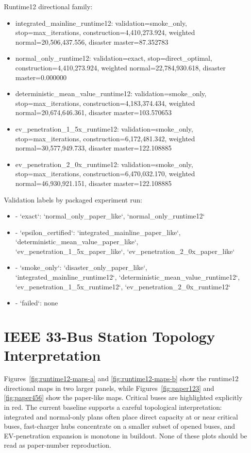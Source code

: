 \documentclass[11pt]{article}
\begin{document}
Runtime12 directional family:
\begin{itemize}
\item integrated\_mainline\_runtime12: validation=smoke\_only, stop=max\_iterations, construction=4,410,273.924, weighted normal=20,506,437.556, disaster master=87.352783
\item normal\_only\_runtime12: validation=exact, stop=direct\_optimal, construction=4,410,273.924, weighted normal=22,784,930.618, disaster master=0.000000
\item deterministic\_mean\_value\_runtime12: validation=smoke\_only, stop=max\_iterations, construction=4,183,374.434, weighted normal=20,674,646.361, disaster master=103.570653
\item ev\_penetration\_1\_5x\_runtime12: validation=smoke\_only, stop=max\_iterations, construction=6,172,481.342, weighted normal=30,577,949.733, disaster master=122.108885
\item ev\_penetration\_2\_0x\_runtime12: validation=smoke\_only, stop=max\_iterations, construction=6,470,032.170, weighted normal=46,930,921.151, disaster master=122.108885
\end{itemize}

Validation labels by packaged experiment run:
\begin{itemize}
\item - `exact`: `normal\_only\_paper\_like`, `normal\_only\_runtime12`
\item - `epsilon\_certified`: `integrated\_mainline\_paper\_like`, `deterministic\_mean\_value\_paper\_like`, `ev\_penetration\_1\_5x\_paper\_like`, `ev\_penetration\_2\_0x\_paper\_like`
\item - `smoke\_only`: `disaster\_only\_paper\_like`, `integrated\_mainline\_runtime12`, `deterministic\_mean\_value\_runtime12`, `ev\_penetration\_1\_5x\_runtime12`, `ev\_penetration\_2\_0x\_runtime12`
\item - `failed`: none
\end{itemize}

\section{IEEE 33-Bus Station Topology Interpretation}
Figures~\ref{fig:runtime12-maps-a} and \ref{fig:runtime12-maps-b} show the runtime12 directional maps in two larger panels, while Figures~\ref{fig:paper123} and \ref{fig:paper456} show the paper-like maps. Critical buses are highlighted explicitly in red. The current baseline supports a careful topological interpretation: integrated and normal-only plans often place direct capacity at or near critical buses, fast-charger hubs concentrate on a smaller subset of opened buses, and EV-penetration expansion is monotone in buildout. None of these plots should be read as paper-number reproduction.
\end{document}
